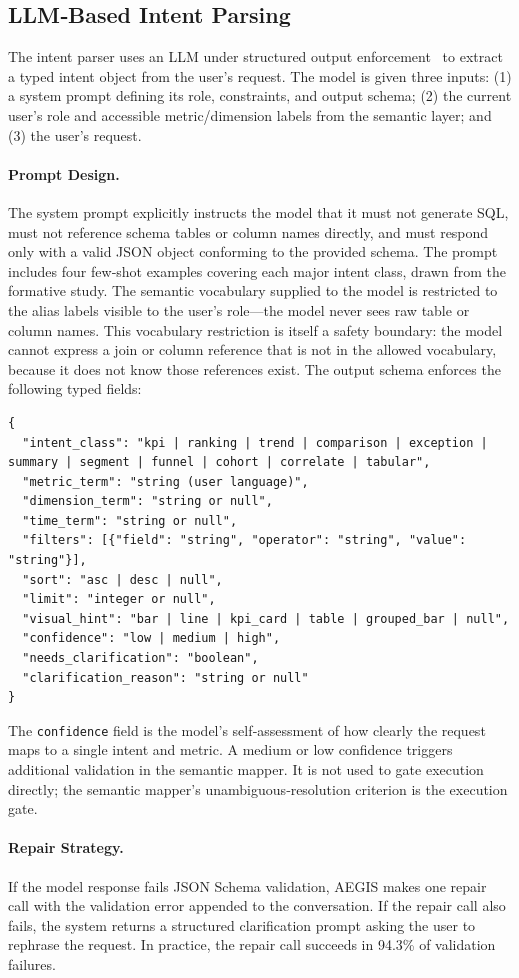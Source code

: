 \documentclass[11pt]{article}
\begin{document}
\subsection{LLM‑Based Intent Parsing}
The intent parser uses an LLM under structured output enforcement~\cite{openai2024structured} to extract a typed intent object from the user's request. The model is given three inputs: (1) a system prompt defining its role, constraints, and output schema; (2) the current user's role and accessible metric/dimension labels from the semantic layer; and (3) the user's request.

\paragraph{Prompt Design.} The system prompt explicitly instructs the model that it must not generate SQL, must not reference schema tables or column names directly, and must respond only with a valid JSON object conforming to the provided schema. The prompt includes four few‑shot examples covering each major intent class, drawn from the formative study. The semantic vocabulary supplied to the model is restricted to the alias labels visible to the user's role—the model never sees raw table or column names. This vocabulary restriction is itself a safety boundary: the model cannot express a join or column reference that is not in the allowed vocabulary, because it does not know those references exist. The output schema enforces the following typed fields:
\begin{verbatim}
{
  "intent_class": "kpi | ranking | trend | comparison | exception | summary | segment | funnel | cohort | correlate | tabular",
  "metric_term": "string (user language)",
  "dimension_term": "string or null",
  "time_term": "string or null",
  "filters": [{"field": "string", "operator": "string", "value": "string"}],
  "sort": "asc | desc | null",
  "limit": "integer or null",
  "visual_hint": "bar | line | kpi_card | table | grouped_bar | null",
  "confidence": "low | medium | high",
  "needs_clarification": "boolean",
  "clarification_reason": "string or null"
}
\end{verbatim}
The \texttt{confidence} field is the model's self‑assessment of how clearly the request maps to a single intent and metric. A medium or low confidence triggers additional validation in the semantic mapper. It is not used to gate execution directly; the semantic mapper's unambiguous‑resolution criterion is the execution gate.

\paragraph{Repair Strategy.} If the model response fails JSON Schema validation, AEGIS makes one repair call with the validation error appended to the conversation. If the repair call also fails, the system returns a structured clarification prompt asking the user to rephrase the request. In practice, the repair call succeeds in 94.3\% of validation failures.
\end{document}
